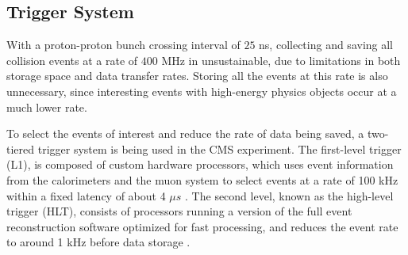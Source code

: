 \subsection{Trigger System}
\label{subsec:trigger_system}

With a proton-proton bunch crossing interval of $25$ ns, collecting and saving all collision events at a rate of $400$ MHz in unsustainable, 
due to limitations in both storage space and data transfer rates. 
Storing all the events at this rate is also unnecessary, since interesting events with high-energy physics objects occur at a much
lower rate.

To select the events of interest and reduce the rate of data being saved, a two-tiered trigger system is being used in the CMS experiment. The first-level
trigger (L1), is composed of custom hardware processors, which uses event information from the calorimeters and the muon system to select events at a rate
of 100 kHz within a fixed latency of about 4 $\mu s$ \cite{cms:l1_paper}. The second level, known as the high-level trigger (HLT), consists of processors 
running a version of the full event reconstruction software optimized for fast processing, and reduces the event rate to around 1 kHz before data storage 
\cite{cms:hlt_paper}. 





